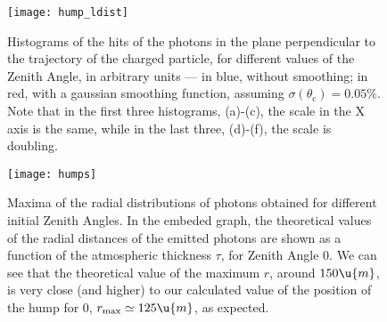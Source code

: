 \begin{figure}[tb]
  \centering \texttt{[image: hump\_ldist]}
  \caption{Histograms of the hits of the \Cherenkov
    photons in the plane perpendicular to the trajectory of the
    charged particle, for different values of the Zenith Angle, in
    arbitrary units --- in blue, without smoothing; in red, with a
    gaussian smoothing function, assuming $\sigma(\theta_{\text{c}}) =
    0.05\text{\%}$. Note that in the first three histograms, (a)-(c),
    the scale in the X axis is the same, while in the last three,
    (d)-(f), the scale is doubling.}
  \label{fig:humpldist}
\end{figure}

\begin{figure}[tb]
  \centering \texttt{[image: humps]}
  \caption{Maxima of the radial distributions of \Cherenkov photons 
    obtained for different initial Zenith Angles. In the embeded
    graph, the theoretical values of the radial distances of the
    emitted \Cherenkov photons are shown as a function of the
    atmospheric thickness $\tau$, for Zenith Angle 0\deg. We can see that
    the theoretical value of the maximum $r$, around $150\u{m}$, is
    very close (and higher) to our calculated value of the position of
    the hump for 0\deg, $r_{\text{max}}\simeq125\u{m}$, as expected.}
  \label{fig:humps}
\end{figure}



  
  
